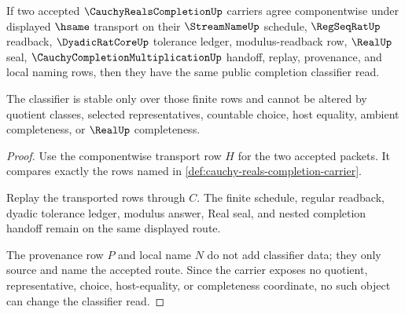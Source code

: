 \begin{theorem}
\label{thm:cauchy-reals-completion-classifier-stability}
If two accepted $\CauchyRealsCompletionUp$ carriers agree componentwise under displayed $\hsame$ transport on their $\StreamNameUp$ schedule, $\RegSeqRatUp$ readback, $\DyadicRatCoreUp$ tolerance ledger, modulus-readback row, $\RealUp$ seal, $\CauchyCompletionMultiplicationUp$ handoff, replay, provenance, and local naming rows, then they have the same public completion classifier read.

The classifier is stable only over those finite rows and cannot be altered by quotient classes, selected representatives, countable choice, host equality, ambient completeness, or $\RealUp$ completeness.
\end{theorem}
\begin{proof}
Use the componentwise transport row $H$ for the two accepted packets. It compares exactly the rows named in \autoref{def:cauchy-reals-completion-carrier}.

Replay the transported rows through $C$. The finite schedule, regular readback, dyadic tolerance ledger, modulus answer, Real seal, and nested completion handoff remain on the same displayed route.

The provenance row $P$ and local name $N$ do not add classifier data; they only source and name the accepted route. Since the carrier exposes no quotient, representative, choice, host-equality, or completeness coordinate, no such object can change the classifier read.
\end{proof}

